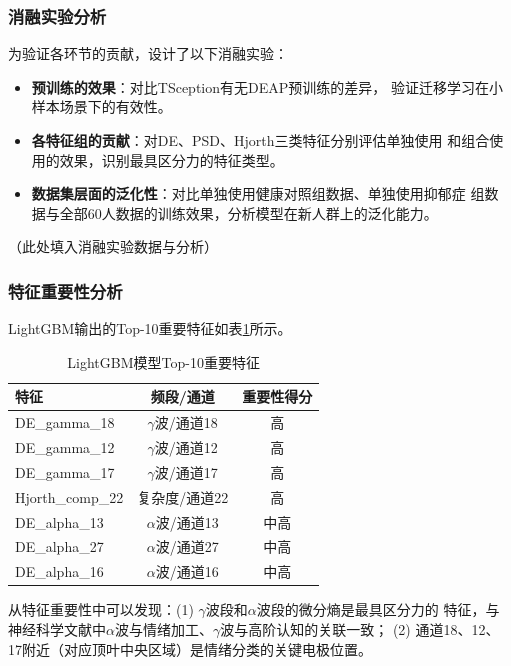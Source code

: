 \documentclass[12pt,a4paper]{ctexrep}
\begin{document}
\subsubsection{消融实验分析}

为验证各环节的贡献，设计了以下消融实验：
\begin{itemize}
    \item \textbf{预训练的效果}：对比TSception有无DEAP预训练的差异，
          验证迁移学习在小样本场景下的有效性。
    \item \textbf{各特征组的贡献}：对DE、PSD、Hjorth三类特征分别评估单独使用
          和组合使用的效果，识别最具区分力的特征类型。
    \item \textbf{数据集层面的泛化性}：对比单独使用健康对照组数据、单独使用抑郁症
          组数据与全部60人数据的训练效果，分析模型在新人群上的泛化能力。
\end{itemize}

（此处填入消融实验数据与分析）

\subsubsection{特征重要性分析}

LightGBM输出的Top-10重要特征如表\ref{tab:features}所示。

\begin{table}[htbp]
\centering
\caption{LightGBM模型Top-10重要特征}
\label{tab:features}
\begin{tabular}{lcc}
\toprule
\textbf{特征} & \textbf{频段/通道} & \textbf{重要性得分} \\
\midrule
DE\_gamma\_18 & $\gamma$波/通道18 & 高 \\
DE\_gamma\_12 & $\gamma$波/通道12 & 高 \\
DE\_gamma\_17 & $\gamma$波/通道17 & 高 \\
Hjorth\_comp\_22 & 复杂度/通道22 & 高 \\
DE\_alpha\_13 & $\alpha$波/通道13 & 中高 \\
DE\_alpha\_27 & $\alpha$波/通道27 & 中高 \\
DE\_alpha\_16 & $\alpha$波/通道16 & 中高 \\
\bottomrule
\end{tabular}
\end{table}

从特征重要性中可以发现：(1) $\gamma$波段和$\alpha$波段的微分熵是最具区分力的
特征，与神经科学文献中$\alpha$波与情绪加工、$\gamma$波与高阶认知的关联一致；
(2) 通道18、12、17附近（对应顶叶中央区域）是情绪分类的关键电极位置。
\end{document}
